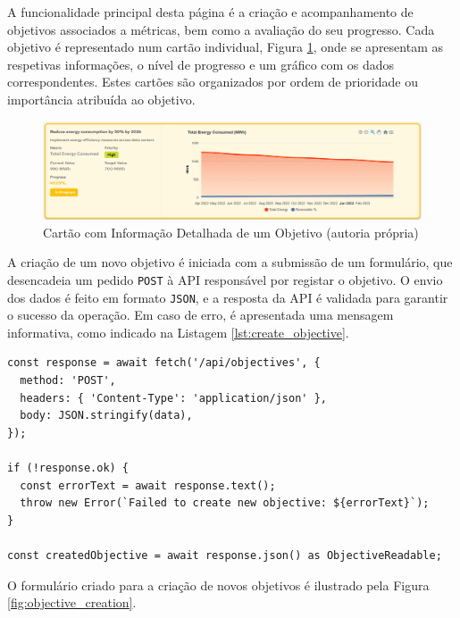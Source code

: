 A funcionalidade principal desta página é a criação e acompanhamento de objetivos associados a métricas, bem como a avaliação do seu progresso. Cada objetivo é representado num cartão individual, Figura \ref{fig:objective_card}, onde se apresentam as respetivas informações, o nível de progresso e um gráfico com os dados correspondentes. Estes cartões são organizados por ordem de prioridade ou importância atribuída ao objetivo.

\begin{figure}[H]
    \centering
    \includegraphics[width=\linewidth,keepaspectratio]{frontmatter/assets/platform_prints/objetives/objective_card.png}
    \caption{Cartão com Informação Detalhada de um Objetivo (autoria própria)}
    \label{fig:objective_card}
\end{figure}

A criação de um novo objetivo é iniciada com a submissão de um formulário, que desencadeia um pedido \texttt{POST} à API responsável por registar o objetivo. O envio dos dados é feito em formato \texttt{JSON}, e a resposta da API é validada para garantir o sucesso da operação. Em caso de erro, é apresentada uma mensagem informativa, como indicado na Listagem \ref{lst:create_objective}.

\begin{lstlisting}[style=customts, caption={Pedido \texttt{POST} para criar um novo Objetivo}, label={lst:create_objective}]
const response = await fetch('/api/objectives', {
  method: 'POST',
  headers: { 'Content-Type': 'application/json' },
  body: JSON.stringify(data),
});

if (!response.ok) {
  const errorText = await response.text();
  throw new Error(`Failed to create new objective: ${errorText}`);
}

const createdObjective = await response.json() as ObjectiveReadable;
\end{lstlisting}

O formulário criado para a criação de novos objetivos é ilustrado pela Figura \ref{fig:objective_creation}.

